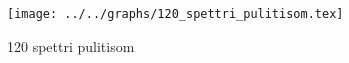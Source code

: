 \begin{figure}[h] \centering\texttt{[image: ../../graphs/120\_spettri\_pulitisom.tex]}\caption{120 spettri pulitisom}\label{gr:120_spettri_pulitisom} \end{figure}
